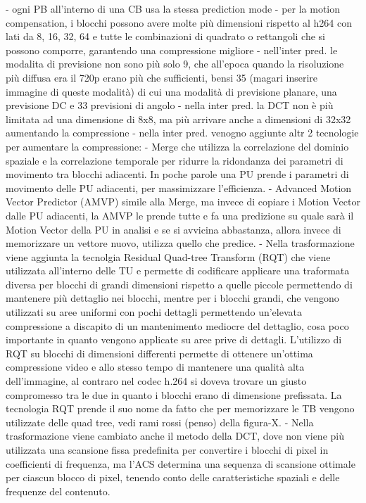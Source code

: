 \documentclass[a4paper,12pt, oneside]{article}
\begin{document}
- ogni PB all'interno di una CB usa la stessa prediction mode
- per la motion compensation, i blocchi possono avere molte più dimensioni rispetto al h264 con lati da 8, 16, 32, 64
e tutte le combinazioni di quadrato o rettangoli che si possono comporre, garantendo una compressione migliore
- nell'inter pred. le modalita di previsione non sono più solo 9, che all'epoca quando la risoluzione più diffusa
era il 720p erano più che sufficienti, bensi 35 (magari inserire immagine di queste modalità) di cui una modalità di previsione
planare, una previsione DC e 33 previsioni di angolo
- nella inter pred. la DCT non è più limitata ad una dimensione di 8x8, ma più arrivare anche a dimensioni di 32x32
aumentando la compressione
- nella inter pred. venogno aggiunte altr 2 tecnologie per aumentare la compressione:
        - Merge che utilizza la correlazione del dominio spaziale e la correlazione temporale per ridurre la ridondanza dei parametri di movimento tra blocchi adiacenti. In poche parole una PU prende i parametri di movimento delle PU adiacenti, per massimizzare l'efficienza.
        - Advanced Motion Vector Predictor (AMVP) simile alla Merge, ma invece di copiare i Motion Vector dalle PU adiacenti,
        la AMVP le prende tutte e fa una predizione su quale sarà il Motion Vector della PU in analisi e se si avvicina
        abbastanza, allora invece di memorizzare un vettore nuovo, utilizza quello che predice.
- Nella trasformazione viene aggiunta la tecnolgia Residual Quad-tree Transform (RQT) che viene utilizzata all'interno delle TU e permette
di codificare applicare una traformata diversa per blocchi di grandi dimensioni rispetto a quelle piccole permettendo di mantenere più dettaglio
nei blocchi, mentre per i blocchi grandi, che vengono utilizzati su aree uniformi con pochi dettagli permettendo un'elevata compressione a discapito
di un mantenimento mediocre del dettaglio, cosa poco importante in quanto vengono applicate su aree prive di dettagli. L'utilizzo di RQT su blocchi di dimensioni differenti permette di ottenere un'ottima compressione video e allo stesso tempo di mantenere una qualità alta dell'immagine, al contraro
nel codec h.264 si doveva trovare un giusto compromesso tra le due in quanto i blocchi erano di dimensione prefissata. La tecnologia RQT prende il suo nome
da fatto che per memorizzare le TB vengono utilizzate delle quad tree, vedi rami rossi (penso) della figura-X.
- Nella trasformazione viene cambiato anche il metodo della DCT, dove non viene più utilizzata una scansione fissa predefinita per convertire i blocchi di pixel in coefficienti di frequenza, ma l'ACS determina una sequenza di scansione ottimale per ciascun blocco di pixel, tenendo conto delle caratteristiche spaziali e delle frequenze del contenuto. 
\end{document}
